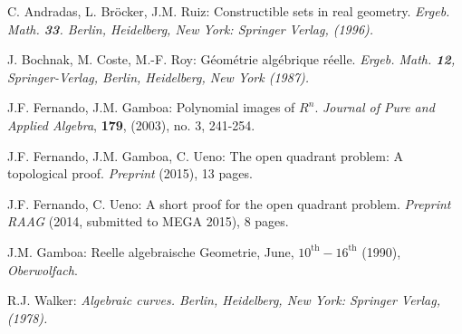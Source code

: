 \documentclass[11pt, a4paper, english, twoside, notitlepage, openright]{report}
\begin{document}
\begin{thebibliography}{10}

 C. Andradas, L. Br\"ocker, J.M. Ruiz: Constructible 
sets in real geometry. \em Ergeb. Math. \em{\bf 33}. Berlin, Heidelberg, 
New York: Springer Verlag, (1996).

 J. Bochnak, M. Coste, M.-F. Roy: G\'eom\'etrie
alg\'ebrique r\'eelle. \em Ergeb. Math. \em {\bf 12}, Springer-Verlag,
Berlin, Heidelberg, New York (1987).

 J.F. Fernando, J.M. Gamboa: Polynomial images of $R^n$.
\textit{Journal of Pure and Applied Algebra}, {\bf 179}, (2003), no. 3, 241-254.

 J.F. Fernando, J.M. Gamboa, C. Ueno: The open quadrant problem:
A topological proof. \textit{Preprint} (2015), 13 pages.

 J.F. Fernando, C. Ueno: A short proof for the open quadrant problem.
\textit{Preprint RAAG} (2014, submitted to MEGA 2015), 8 pages.

 J.M. Gamboa: Reelle algebraische Geometrie, June,
$10^{\text{th}}-16^{\text{th}}$ (1990), \textit{Oberwolfach}.

 R.J. Walker: \em Algebraic curves. \em Berlin, Heidelberg, 
New York: Springer Verlag, (1978).



\end{thebibliography}
\end{document}
